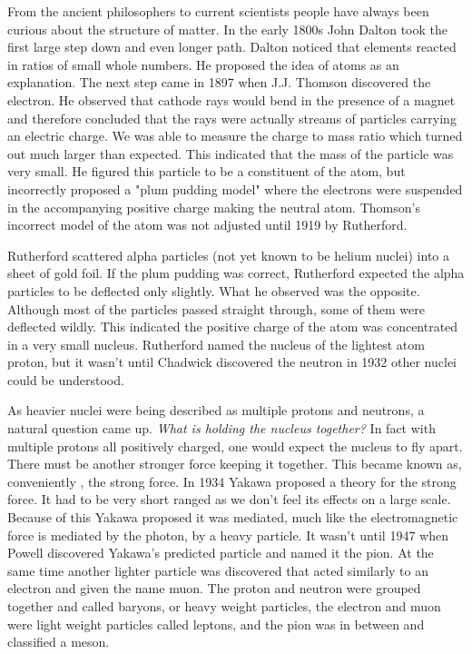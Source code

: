 \documentclass[abstract = on,listof=totoc, bibliography=totoc]{scrreprt}
\begin{document}
From the ancient philosophers to current scientists people have always been curious about the structure of matter. In the early 1800s John Dalton took the first large step down and even longer path. Dalton noticed that elements reacted in ratios of small whole numbers. He proposed the idea of atoms as an explanation. The next step came in 1897 when J.J. Thomson discovered the electron. He observed that cathode rays would bend in the presence of a magnet and therefore concluded that the rays were actually streams of particles carrying an electric charge. We was able to measure the charge to mass ratio which turned out much larger than expected. This indicated that the mass of the particle was very small. He figured this particle to be a constituent of the atom, but incorrectly proposed a "plum pudding model" where the electrons were suspended in the accompanying positive charge making the neutral atom. Thomson's incorrect model of the atom was not adjusted until 1919 by Rutherford.

Rutherford scattered alpha particles (not yet known to be helium nuclei) into a sheet of gold foil. If the plum pudding was correct, Rutherford expected the alpha particles to be deflected only slightly. What he observed was the opposite. Although most of the particles passed straight through, some of them were deflected wildly. This indicated the positive charge of the atom was concentrated in a very small nucleus. Rutherford named the nucleus of the lightest atom proton, but it wasn't until Chadwick discovered the neutron in 1932 other nuclei could be understood.\cite{IEP}

As heavier nuclei were being described as multiple protons and neutrons, a natural question came up. \textit{What is holding the nucleus together?} In fact with multiple protons all positively charged, one would expect the nucleus to fly apart. There must be another stronger force keeping it together. This became known as, conveniently , the strong force. In 1934 Yakawa proposed a theory for the strong force. It had to be very short ranged as we don't feel its effects on a large scale. Because of this Yakawa proposed it was mediated, much like the electromagnetic force is mediated by the photon, by a heavy particle.  It wasn't until 1947 when Powell discovered Yakawa's predicted particle and named it the pion. At the same time another lighter particle was discovered that acted similarly to an electron and given the name muon. The proton and neutron were grouped together and called baryons, or heavy weight particles, the electron and muon were light weight particles called leptons, and the pion was in between and classified a meson.\cite{IEP}  
\end{document}
